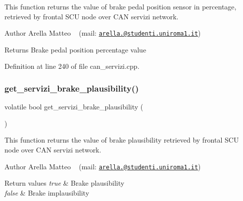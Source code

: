 This function returns the value of brake pedal position sensor in percentage, retrieved by frontal S\+CU node over C\+AN servizi network. 

\begin{DoxyAuthor}{Author}
Arella Matteo ~\newline
 (mail\+: \href{mailto:arella.1646983@studenti.uniroma1.it}{\tt arella.@studenti.\+uniroma1.\+it})
\end{DoxyAuthor}
\begin{DoxyReturn}{Returns}
Brake pedal position percentage value 
\end{DoxyReturn}


Definition at line 240 of file can\+\_\+servizi.\+cpp.

\mbox{\label{group___c_a_n__servizi__group_ga064fdc5f825b2d50b1b13509e3f135d2}} 
\subsubsection{\texorpdfstring{get\+\_\+servizi\+\_\+brake\+\_\+plausibility()}{get\_servizi\_brake\_plausibility()}}
{\footnotesize\ttfamily volatile bool get\+\_\+servizi\+\_\+brake\+\_\+plausibility (\begin{DoxyParamCaption}{ }\end{DoxyParamCaption})}



This function returns the value of brake plausibility retrieved by frontal S\+CU node over C\+AN servizi network. 

\begin{DoxyAuthor}{Author}
Arella Matteo ~\newline
 (mail\+: \href{mailto:arella.1646983@studenti.uniroma1.it}{\tt arella.@studenti.\+uniroma1.\+it})
\end{DoxyAuthor}

\begin{DoxyRetVals}{Return values}
{\em true} & Brake plausibility \\
\hline
{\em false} & Brake implausibility \\
\hline
\end{DoxyRetVals}


